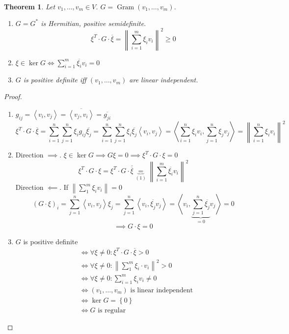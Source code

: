 \documentclass{article}
\newcounter{lecref}[section]
\numberwithin{lecref}{section}
\newtheorem{theorem}[lecref]{Theorem}
\newcommand{\set}[1]{\left\{#1\right\}}
\newcommand{\ip}[2]{\left\langle#1,#2\right\rangle} %
\newcommand{\norm}[1]{\left\|#1\right\|}
\begin{document}
\begin{theorem} %
  Let $v_1, \ldots, v_m \in V$. $G = \operatorname{Gram}(v_1, \ldots, v_m)$.
  \begin{enumerate}
    \item $G = G^*$ is Hermitian, positive \emph{semi}definite.
      \[ \xi^T \cdot G \cdot \overline{\xi} = \norm{\sum_{i=1}^m \xi_i v_i}^2 \geq 0 \]
    \item $\xi \in \ker{G} \iff \sum_{i=1}^m \overline{\xi_i} v_i = 0$
    \item $G$ is positive definite iff $(v_1, \ldots, v_m)$ are linear independent.
  \end{enumerate}
\end{theorem}

\begin{proof}
  \begin{enumerate}
    \item $g_{ij} = \ip{v_i}{v_j} = \overline{\ip{v_j}{v_i}} = \overline{g_{ji}}$
      \[ \xi^T \cdot G \cdot \overline{\xi} = \sum_{i=1}^n \sum_{j=1}^n \xi_i g_{ij} \overline{\xi_j} = \sum_{i=1}^n \sum_{j=1}^n \xi_i \overline{\xi_j} \ip{v_i}{v_j} = \ip{\sum_{i=1}^n \xi_i v_i}{\sum_{j=1}^n \xi_j v_j} = \norm{\sum_{i=1}^n \xi_i v_i}^2 \]
    \item
      Direction $\implies$.
      $\xi \in \ker{G} \implies G \xi = 0 \implies \xi^T \cdot G \cdot \xi = 0$
      \[ \xi^T \cdot G \cdot \xi = \xi^T \cdot G \cdot \overline{\overline{\xi}} \underbrace{=}_{(1)} \norm{\sum_{i=1}^m \overline{\xi_i} v_i}^2 \]
      Direction $\impliedby$. If $\norm{\sum_1^m \xi_i v_i} = 0$
      \[ (G \cdot \xi)_i = \sum_{j=1}^n \ip{v_i}{v_j} \xi_j = \sum_{j=1}^n \ip{v_i}{\overline{\xi_j} v_j} = \ip{v_i}{\underbrace{\sum_{j=1}^n \overline{\xi_j}}_{=0} v_j} = 0 \]
      \[ \implies G \cdot \xi = 0 \]
    \item $G$ is positive definite
      \begin{align*}
        &\iff \forall \xi \neq 0: \xi^T \cdot G \cdot \overline \xi > 0 \\
        &\iff \forall \xi \neq 0: \norm{\sum_1^m \xi_i \cdot v_i}^2 > 0 \\
        &\iff \forall \xi \neq 0: \sum_{i=1}^m \xi_i v_i \neq 0 \\
        &\iff (v_1, \ldots, v_m) \text{ is linear independent} \\
        &\iff \ker{G} = \set{0} \\
        &\iff G \text{ is regular}
      \end{align*}
  \end{enumerate}
\end{proof}
\end{document}
